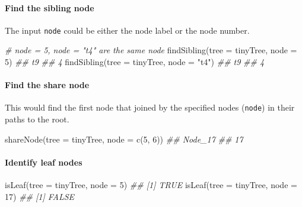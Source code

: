 \documentclass[]{article}
\newcommand{\hlnum}[1]{\textcolor[rgb]{0.816,0.125,0.439}{#1}}%
\newcommand{\hlstr}[1]{\textcolor[rgb]{0.251,0.627,0.251}{#1}}%
\newcommand{\hlcom}[1]{\textcolor[rgb]{0.502,0.502,0.502}{\textit{#1}}}%
\newcommand{\hlstd}[1]{\textcolor[rgb]{0.251,0.251,0.251}{#1}}%
\newcommand{\hlkwc}[1]{\textcolor[rgb]{0.251,0.251,0.251}{#1}}%
\newcommand{\hlkwd}[1]{\textcolor[rgb]{0.878,0.439,0.125}{#1}}%
\newenvironment{Shaded}{\begin{myshaded}}{\end{myshaded}}
\newcommand{\KeywordTok}[1]{\hlkwd{#1}}
\newcommand{\DataTypeTok}[1]{\hlkwc{#1}}
\newcommand{\DecValTok}[1]{\hlnum{#1}}
\newcommand{\StringTok}[1]{\hlstr{#1}}
\newcommand{\CommentTok}[1]{\hlcom{#1}}
\newcommand{\NormalTok}[1]{\hlstd{#1}}
\begin{document}
\hypertarget{find-the-sibling-node}{%
\paragraph{Find the sibling node}\label{find-the-sibling-node}}

The input \texttt{node} could be either the node label or the node number.

\begin{Shaded}
\begin{Highlighting}[]
\CommentTok{# node = 5, node = "t4" are the same node}
\KeywordTok{findSibling}\NormalTok{(}\DataTypeTok{tree =}\NormalTok{ tinyTree, }\DataTypeTok{node =} \DecValTok{5}\NormalTok{)}
\CommentTok{## t9 }
\CommentTok{##  4}
\KeywordTok{findSibling}\NormalTok{(}\DataTypeTok{tree =}\NormalTok{ tinyTree, }\DataTypeTok{node =} \StringTok{"t4"}\NormalTok{)}
\CommentTok{## t9 }
\CommentTok{##  4}
\end{Highlighting}
\end{Shaded}

\hypertarget{find-the-share-node}{%
\paragraph{Find the share node}\label{find-the-share-node}}

This would find the first node that joined by the specified nodes (\texttt{node}) in
their paths to the root.

\begin{Shaded}
\begin{Highlighting}[]
\KeywordTok{shareNode}\NormalTok{(}\DataTypeTok{tree =}\NormalTok{ tinyTree, }\DataTypeTok{node =} \KeywordTok{c}\NormalTok{(}\DecValTok{5}\NormalTok{, }\DecValTok{6}\NormalTok{))}
\CommentTok{## Node_17 }
\CommentTok{##      17}
\end{Highlighting}
\end{Shaded}

\hypertarget{identify-leaf-nodes}{%
\paragraph{Identify leaf nodes}\label{identify-leaf-nodes}}

\begin{Shaded}
\begin{Highlighting}[]
\KeywordTok{isLeaf}\NormalTok{(}\DataTypeTok{tree =}\NormalTok{ tinyTree, }\DataTypeTok{node =} \DecValTok{5}\NormalTok{)}
\CommentTok{## [1] TRUE}
\KeywordTok{isLeaf}\NormalTok{(}\DataTypeTok{tree =}\NormalTok{ tinyTree, }\DataTypeTok{node =} \DecValTok{17}\NormalTok{)}
\CommentTok{## [1] FALSE}
\end{Highlighting}
\end{Shaded}
\end{document}

